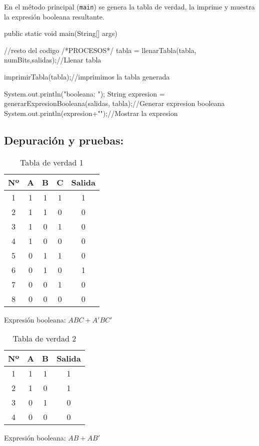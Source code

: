 En el método principal (\texttt{main}) se genera la tabla de verdad, la imprime y muestra la expresión booleana resultante.
\begin{javaCode}
public static void main(String[] args) {
    //resto del codigo
    /*PROCESOS*/
    tabla = llenarTabla(tabla, numBits,salidas);//Llenar tabla
    
    imprimirTabla(tabla);//imprimimos la tabla generada
    
    System.out.println("\nExpresion booleana: ");
    String expresion = generarExpresionBooleana(salidas, tabla);//Generar expresion booleana
    System.out.println(expresion+"\n");//Mostrar la expresion
}
\end{javaCode}

\subsection{\textbf{Depuración y pruebas:}}

\begin{table}[h]
\centering
\begin{tabular}{|c|c|c|c|c|}
\hline
\textbf{Nº} & \textbf{A} & \textbf{B} & \textbf{C} & \textbf{Salida} \\
\hline
1 & 1 & 1 & 1 & 1 \\
2 & 1 & 1 & 0 & 0 \\
3 & 1 & 0 & 1 & 0 \\
4 & 1 & 0 & 0 & 0 \\
5 & 0 & 1 & 1 & 0 \\
6 & 0 & 1 & 0 & 1 \\
7 & 0 & 0 & 1 & 0 \\
8 & 0 & 0 & 0 & 0 \\
\hline
\end{tabular}
\caption{Tabla de verdad 1}
Expresión booleana: $ABC + A'BC'$
\end{table}
\begin{table}[h]
\centering
\begin{tabular}{|c|c|c|c|}
\hline
\textbf{Nº} & \textbf{A} & \textbf{B} & \textbf{Salida} \\
\hline
1 & 1 & 1 & 1 \\
2 & 1 & 0 & 1 \\
3 & 0 & 1 & 0 \\
4 & 0 & 0 & 0 \\
\hline
\end{tabular}
\caption{Tabla de verdad 2}
Expresión booleana: $AB + AB'$
\end{table}
